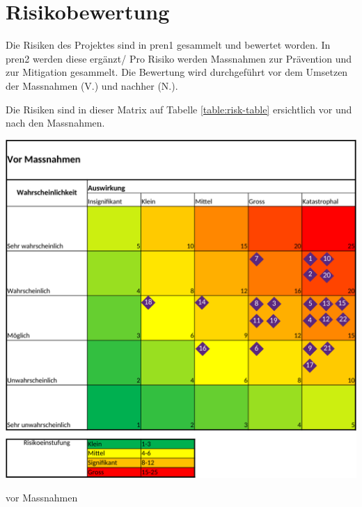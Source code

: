 \section{Risikobewertung}


Die Risiken des Projektes sind in \acrshort{pren1} gesammelt und bewertet worden. In \acrshort{pren2} werden diese ergänzt/ Pro Risiko werden Massnahmen zur Prävention und zur Mitigation gesammelt. Die Bewertung wird durchgeführt vor dem Umsetzen der Massnahmen (V.) und nachher (N.).

Die Risiken sind in dieser Matrix auf Tabelle \ref{table:risk-table} ersichtlich vor und nach den Massnahmen.

\begin{table}[H]
\centering
\begin{subtable}{0.49\textwidth}
\centering
\includegraphics[width=0.99\linewidth]{assets/projektmanagement/Risikoanalyse_vorher-crop.pdf}
\caption{vor Massnahmen}
\label{table:risk-before}
\end{subtable}
\begin{subtable}{0.49\textwidth}
\centering

\end{subtable}
\end{table}
